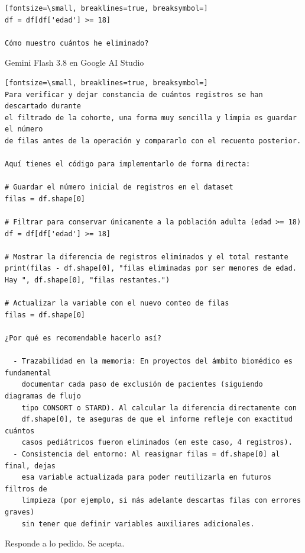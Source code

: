 \documentclass[12pt,a4paper,oneside]{book}
\begin{document}
\begin{iaprompt}
\begin{Verbatim}[fontsize=\small, breaklines=true, breaksymbol=]
df = df[df['edad'] >= 18]

Cómo muestro cuántos he eliminado?
\end{Verbatim}
\end{iaprompt}
\begin{iaresp}{Gemini Flash 3.8 en Google AI Studio}
\begin{Verbatim}[fontsize=\small, breaklines=true, breaksymbol=]
Para verificar y dejar constancia de cuántos registros se han descartado durante
el filtrado de la cohorte, una forma muy sencilla y limpia es guardar el número
de filas antes de la operación y compararlo con el recuento posterior.

Aquí tienes el código para implementarlo de forma directa:

# Guardar el número inicial de registros en el dataset
filas = df.shape[0]

# Filtrar para conservar únicamente a la población adulta (edad >= 18)
df = df[df['edad'] >= 18]

# Mostrar la diferencia de registros eliminados y el total restante
print(filas - df.shape[0], "filas eliminadas por ser menores de edad. Hay ", df.shape[0], "filas restantes.")

# Actualizar la variable con el nuevo conteo de filas
filas = df.shape[0]

¿Por qué es recomendable hacerlo así?

  - Trazabilidad en la memoria: En proyectos del ámbito biomédico es fundamental
    documentar cada paso de exclusión de pacientes (siguiendo diagramas de flujo
    tipo CONSORT o STARD). Al calcular la diferencia directamente con
    df.shape[0], te aseguras de que el informe refleje con exactitud cuántos
    casos pediátricos fueron eliminados (en este caso, 4 registros).
  - Consistencia del entorno: Al reasignar filas = df.shape[0] al final, dejas
    esa variable actualizada para poder reutilizarla en futuros filtros de
    limpieza (por ejemplo, si más adelante descartas filas con errores graves)
    sin tener que definir variables auxiliares adicionales.
\end{Verbatim}
\end{iaresp}
\begin{iaanalisis}
Responde a lo pedido. Se acepta.
\end{iaanalisis}
\end{document}
